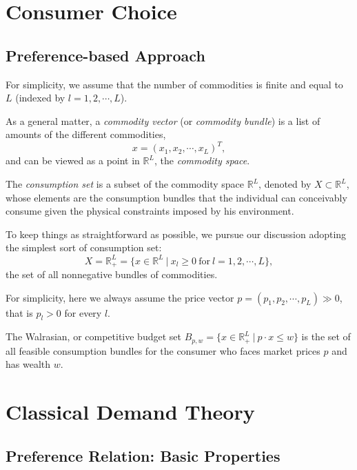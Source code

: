 \documentclass[12pt,fleqn]{book} %
\begin{document}

\chapter{Consumer Choice}

\section{Preference-based Approach}
For simplicity, we assume that the number of commodities is finite and equal to $L$ (indexed by $l=1,2,\cdots,L$).

As a general matter, a \emph{commodity vector} (or \emph{commodity bundle}) is a list of amounts of the different commodities,
\[
x=(x_1,x_2,\cdots,x_L)^T,
\]
and can be viewed as a point in $\mathbb{R}^L$, the \emph{commodity space}.

\begin{definition}
The \emph{consumption set} is a subset of the commodity space $\mathbb{R}^L$, denoted by $X\subset\mathbb{R}^L$, whose elements are the consumption bundles that the individual can conceivably consume given the physical constraints imposed by his environment.
\end{definition}

To keep things as straightforward as possible, we pursue our discussion adopting the simplest sort of consumption set:
\[
X=\mathbb{R}_+^L=\{x\in\mathbb{R}^L\ |\ x_l\ge0\ \text{for}\ l=1,2,\cdots,L\},
\]
the set of all nonnegative bundles of commodities.

For simplicity, here we always assume the price vector $p=(p_1,p_2,\cdots,p_L) \gg 0$, that is $p_l> 0$ for every $l$.

\begin{definition}
	The Walrasian, or competitive budget set $B_{p,w} = \{x\in \mathbb{R}_+^L\ |\ p\cdot x\le w\}$	is the set of all feasible consumption bundles for the consumer who faces market
	prices $p$ and has wealth $w$.
\end{definition}



\chapter{Classical Demand Theory}

\section{Preference Relation: Basic Properties}
\end{document}
